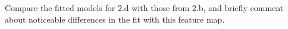 \item {}

Compare the fitted models for 2.d with those from 2.b, and briefly comment about noticeable differences in the fit with this feature map.